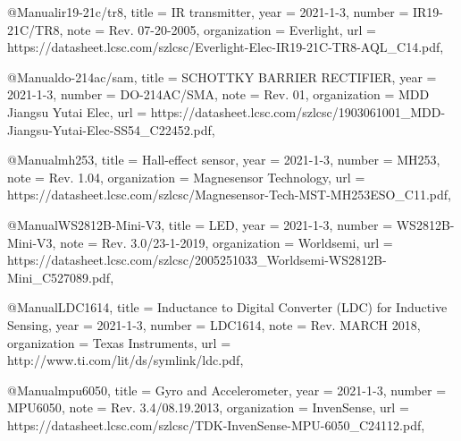 @Manual{ir19-21c/tr8,
    title        = {IR transmitter},
    year         = {2021-1-3},
    number       = {IR19-21C/TR8},
    note         = {Rev. 07-20-2005},
    organization = {Everlight},
    url          = {https://datasheet.lcsc.com/szlcsc/Everlight-Elec-IR19-21C-TR8-AQL\_C14\-.pdf},
}

@Manual{do-214ac/sam,
    title        = {SCHOTTKY BARRIER RECTIFIER},
    year         = {2021-1-3},
    number       = {DO-214AC/SMA},
    note         = {Rev. 01},
    organization = {MDD Jiangsu Yutai Elec},
    url          = {https://datasheet.lcsc.com/szlcsc/1903061001\-\_\-MDD-Jiangsu-Yutai-Elec-SS54\_C22452.pdf},
}   

@Manual{mh253,
    title        = {Hall-effect sensor},
    year         = {2021-1-3},
    number       = {MH253},
    note         = {Rev. 1.04},
    organization = {Magnesensor Technology},
    url          = {https://datasheet.lcsc.com/szlcsc/Magnesensor-Tech-MST-MH253ESO\_C11\-.pdf},
}  

@Manual{WS2812B-Mini-V3,
    title        = {LED},
    year         = {2021-1-3},
    number       = {WS2812B-Mini-V3},
    note         = {Rev. 3.0/23-1-2019},
    organization = {Worldsemi},
    url          = {https://datasheet.lcsc.com/szlcsc/2005251033\_Worldsemi-WS2812B-Mini\_C527089.pdf},
}

@Manual{LDC1614,
    title        = {Inductance to Digital Converter (LDC) for Inductive Sensing},
    year         = {2021-1-3},
    number       = {LDC1614},
    note         = {Rev. MARCH 2018},
    organization = {Texas Instruments},
    url          = {http://www.ti.com/lit/ds/sym\-link\-/ldc\-.pdf},
}

@Manual{mpu6050,
    title        = {Gyro and Accelerometer},
    year         = {2021-1-3},
    number       = {MPU6050},
    note         = {Rev. 3.4/08.19.2013},
    organization = {InvenSense},
    url          = {https://datasheet.lcsc.com/szlcsc/TDK-InvenSense-MPU-6050\-\_\-C24\-112.pdf},
}

